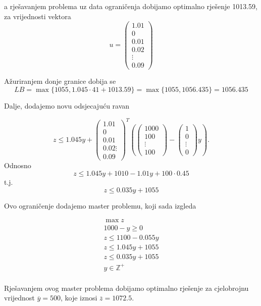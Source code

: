 \documentclass[b5paper, utf8, 11pt, colorlinks]{book}
\theoremstyle{definition}
\begin{document}
a rješavanjem problema uz data ograničenja dobijamo optimalno rješenje 1013.59, za vrijednosti vektora 
$$u=\left(\begin{array}{c}
	1.01 \\
	0 \\
	0.01\\
	0.02\\
	\vdots \\
	0.09
\end{array}\right)$$

Ažuriranjem donje granice dobija se 
$$LB = \max\{1055,1.045\cdot41+1013.59\} = \max\{1055,1056.435\} = 1056.435 $$

Dalje, dodajemo novu odsjecajuću ravan

$$z\leqslant 1.045y+\left(\begin{array}{c}
	1.01 \\
	0 \\
	0.01\\
	0.02
	\vdots \\
	0.09
\end{array}\right)^T
\left(\left(\begin{array}{c}
	1000 \\
	100 \\
	\vdots \\
	100
\end{array}\right)-\left(\begin{array}{c}
	1 \\
	0 \\
	\vdots \\
	0
\end{array}\right)y\right).$$
Odnosno 
$$z\leqslant 1.045y+1010-1.01y+100\cdot0.45$$
t.j.
$$z\leqslant 0.035y+1055$$

Ovo ograničenje dodajemo master problemu, koji sada izgleda


$$
\begin{aligned}
	\max z\\
	1000-y\geqslant 0\\
	z\leqslant 1100-0.055y\\ 
	z\leqslant 1.045y+1055\\
	z\leqslant 0.035y+1055\\
	y\in\mathbb{Z}^+\\	
\end{aligned}
$$

Rješavanjem ovog master problema dobijamo optimalno rješenje 
 za cjelobrojnu vrijednost $\overline{y}=500$, koje iznosi $\overline{z} = 1072.5$.
 
\end{document}
